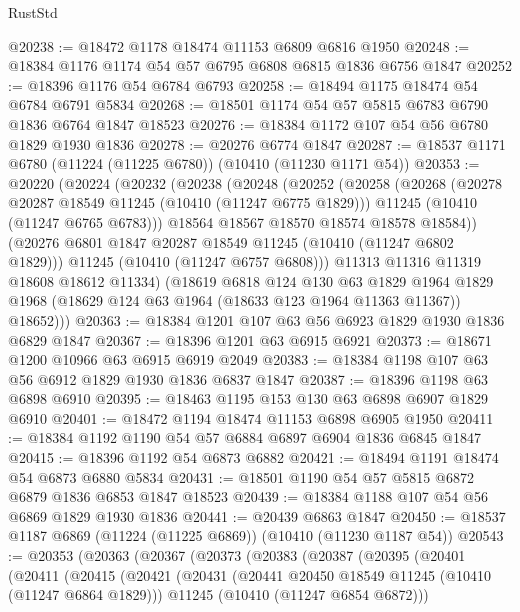 \begin{lexlean}{RustStd}
\begin{coremodule}
@20238 := @18472 @1178 @18474 @11153 @6809 @6816 @1950
@20248 := @18384 @1176 @1174 @54 @57 @6795 @6808 @6815 @1836 @6756 @1847
@20252 := @18396 @1176 @54 @6784 @6793
@20258 := @18494 @1175 @18474 @54 @6784 @6791 @5834
@20268 := @18501 @1174 @54 @57 @5815 @6783 @6790 @1836 @6764 @1847 @18523
@20276 := @18384 @1172 @107 @54 @56 @6780 @1829 @1930 @1836
@20278 := @20276 @6774 @1847
@20287 := @18537 @1171 @6780 (@11224 (@11225 @6780)) (@10410 (@11230 @1171 @54))
@20353 := @20220
    (@20224
      (@20232
        (@20238
          (@20248
            (@20252
              (@20258
                (@20268
                  (@20278 @20287 @18549 @11245 (@10410 (@11247 @6775 @1829)))
                  @11245
                  (@10410 (@11247 @6765 @6783)))
                @18564
                @18567
                @18570
                @18574
                @18578
                @18584))
            (@20276 @6801 @1847 @20287 @18549 @11245 (@10410 (@11247 @6802 @1829)))
            @11245
            (@10410 (@11247 @6757 @6808)))
          @11313
          @11316
          @11319
          @18608
          @18612
          @11334)
        (@18619
          @6818
          @124
          @130
          @63
          @1829
          @1964
          @1829
          @1968
          (@18629 @124 @63 @1964 (@18633 @123 @1964 @11363 @11367))
          @18652)))
@20363 := @18384 @1201 @107 @63 @56 @6923 @1829 @1930 @1836 @6829 @1847
@20367 := @18396 @1201 @63 @6915 @6921
@20373 := @18671 @1200 @10966 @63 @6915 @6919 @2049
@20383 := @18384 @1198 @107 @63 @56 @6912 @1829 @1930 @1836 @6837 @1847
@20387 := @18396 @1198 @63 @6898 @6910
@20395 := @18463 @1195 @153 @130 @63 @6898 @6907 @1829 @6910
@20401 := @18472 @1194 @18474 @11153 @6898 @6905 @1950
@20411 := @18384 @1192 @1190 @54 @57 @6884 @6897 @6904 @1836 @6845 @1847
@20415 := @18396 @1192 @54 @6873 @6882
@20421 := @18494 @1191 @18474 @54 @6873 @6880 @5834
@20431 := @18501 @1190 @54 @57 @5815 @6872 @6879 @1836 @6853 @1847 @18523
@20439 := @18384 @1188 @107 @54 @56 @6869 @1829 @1930 @1836
@20441 := @20439 @6863 @1847
@20450 := @18537 @1187 @6869 (@11224 (@11225 @6869)) (@10410 (@11230 @1187 @54))
@20543 := @20353
    (@20363
      (@20367
        (@20373
          (@20383
            (@20387
              (@20395
                (@20401
                  (@20411
                    (@20415
                      (@20421
                        (@20431
                          (@20441 @20450 @18549 @11245 (@10410 (@11247 @6864 @1829)))
                          @11245
                          (@10410 (@11247 @6854 @6872)))

\end{coremodule}
\end{lexlean}
